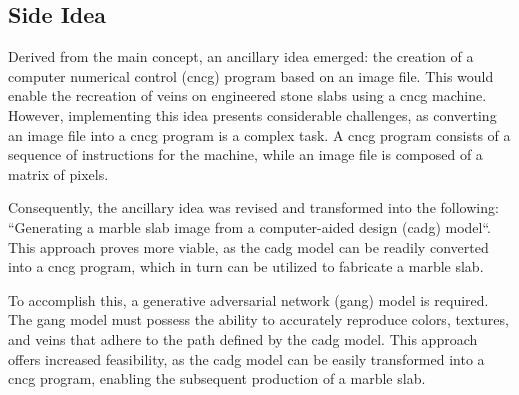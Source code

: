 \subsection{Side Idea}
Derived from the main concept, an ancillary idea emerged: the creation of a computer numerical control (\gls{cncg}\glsfirstoccur) program based on an image file. 
This would enable the recreation of veins on engineered stone slabs using a \gls{cncg} machine. 
However, implementing this idea presents considerable challenges, as converting an image file into a \gls{cncg} program is a complex task. 
A \gls{cncg} program consists of a sequence of instructions for the machine, while an image file is composed of a matrix of pixels.

Consequently, the ancillary idea was revised and transformed into the following: ``Generating a marble slab image from a computer-aided design (\gls{cadg}\glsfirstoccur) model``.
This approach proves more viable, as the \gls{cadg} model can be readily converted into a \gls{cncg} program, which in turn can be utilized to fabricate a marble slab.

To accomplish this, a generative adversarial network (\gls{gang}\glsfirstoccur) model is required. 
The \gls{gang} model must possess the ability to accurately reproduce colors, textures, and veins that adhere to the path defined by the \gls{cadg} model. 
This approach offers increased feasibility, as the \gls{cadg} model can be easily transformed into a \gls{cncg} program, enabling the subsequent production of a marble slab.

